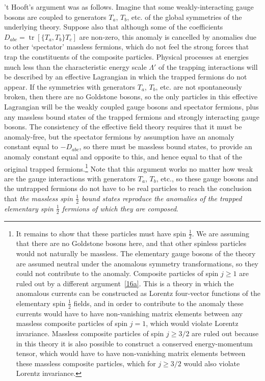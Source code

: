 't Hooft's argument was as follows. Imagine that some weakly-interacting
gauge bosons are coupled to generators $T_a$, $T_b$, etc. of the
global symmetries of the underlying theory. Suppose also that although some
of the coefficients
$D_{abc}=\operatorname{tr}[\{T_a,T_b\}T_c]$
are non-zero, this anomaly is cancelled by anomalies due to other
`spectator' massless fermions, which do not feel the strong forces that
trap the constituents of the composite particles. Physical processes at
energies much less than the characteristic energy scale $\Lambda'$ of the
trapping interactions will be described by an effective Lagrangian in
which the trapped fermions do not appear. If the symmetries with generators
$T_a$, $T_b$, etc. are not spontaneously broken, then there are
no Goldstone bosons, so the only particles in this effective Lagrangian
will be the weakly coupled gauge bosons and spectator fermions, plus any
massless bound states of the trapped fermions and strongly interacting
gauge bosons. The consistency of the effective field theory requires that
it must be anomaly-free, but the spectator fermions by assumption have an
anomaly constant equal to $-D_{abc}$, so there must be
massless bound states, to provide an anomaly constant equal and opposite to
this, and hence equal to that of the original trapped fermions.\footnote{It
remains to show that these particles must have spin $\frac12$. We are
assuming that there are no Goldstone bosons here, and that other spinless
particles would not naturally be massless. The elementary gauge bosons of
the theory are assumed neutral under the anomalous symmetry
transformations, so they could not contribute to the anomaly. Composite
particles of spin $j\geq1$ are ruled out by a different
argument~\hyperref[ch22-ref-16a]{[16a]}. This is a theory in which the
anomalous currents can be constructed as Lorentz four-vector functions of
the elementary spin $\frac12$ fields, and in order to contribute to the
anomaly these currents would have to have non-vanishing matrix elements
between any massless composite particles of spin $j=1$, which would
violate Lorentz invariance. Massless composite particles of spin
$j\geq3/2$ are ruled out because in this theory it is also possible to
construct a conserved energy-momentum tensor, which would have to have
non-vanishing matrix elements between these massless composite particles,
which for $j\geq3/2$ would also violate Lorentz invariance.} Note that this
argument works no matter how weak are the gauge interactions with
generators $T_a$, $T_b$, etc., so these gauge bosons and the
untrapped fermions do not have to be real particles to reach the conclusion
that \emph{the massless spin $\frac12$ bound states reproduce the anomalies
of the trapped elementary spin $\frac12$ fermions of which they are
composed}.

